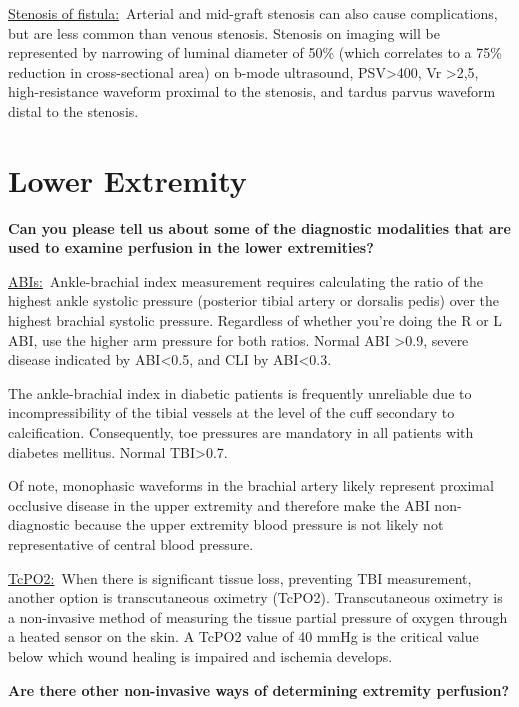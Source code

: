 \documentclass[
]{book}
\begin{document}
\uline{Stenosis of fistula:}~Arterial and mid-graft stenosis can
also cause complications, but are less common than venous stenosis.
Stenosis on imaging will be represented by narrowing of luminal diameter
of 50\% (which correlates to a 75\% reduction in cross-sectional area) on
b-mode ultrasound, PSV\textgreater400, Vr \textgreater2,5, high-resistance waveform proximal
to the stenosis, and tardus parvus waveform distal to the
stenosis.\citep{bandyk2013}

\hypertarget{lower-extremity}{%
\section{Lower Extremity}\label{lower-extremity}}

\textbf{Can you please tell us about some of the diagnostic modalities that
are used to examine perfusion in the lower extremities?}

\uline{ABIs:}~Ankle-brachial index measurement requires
calculating the ratio of the highest ankle systolic pressure (posterior
tibial artery or dorsalis pedis) over the highest brachial systolic
pressure. Regardless of whether you're doing the R or L ABI, use the
higher arm pressure for both ratios. Normal ABI \textgreater0.9, severe disease
indicated by ABI\textless0.5, and CLI by ABI\textless0.3.

The ankle-brachial index in diabetic patients is frequently unreliable
due to incompressibility of the tibial vessels at the level of the cuff
secondary to calcification. Consequently, toe pressures are mandatory in
all patients with diabetes mellitus. Normal TBI\textgreater0.7.

Of note, monophasic waveforms in the brachial artery likely represent
proximal occlusive disease in the upper extremity and therefore make the
ABI non-diagnostic because the upper extremity blood pressure is not
likely not representative of central blood pressure.\citep{chen2014}

\uline{TcPO2:}~When there is significant tissue loss, preventing
TBI measurement, another option is transcutaneous oximetry
(TcPO2).\citep{mills2014} Transcutaneous oximetry is a non-invasive method of
measuring the tissue partial pressure of oxygen through a heated sensor
on the skin. A TcPO2 value of 40 mmHg is the critical value below which
wound healing is impaired and ischemia develops.

\textbf{Are there other non-invasive ways of determining extremity
perfusion?}
\end{document}
